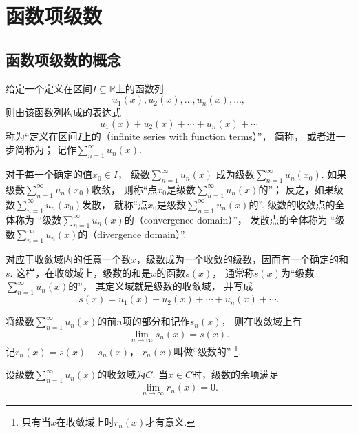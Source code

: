 \section{函数项级数}
\subsection{函数项级数的概念}
\begin{definition}\label{definition:无穷级数.实函数项级数的概念}
给定一个定义在区间\(I \subseteq \mathbb{R}\)上的函数列\[
	u_1(x),u_2(x),\dotsc,u_n(x),\dotsc,
\]
则由该函数列构成的表达式\[
	u_1(x)+u_2(x)+\dotsb+u_n(x)+\dotsb
\]
称为“定义在区间\(I\)上的（infinite series with function terms）”，
简称，
或者进一步简称为；
记作\(\sum\limits_{n=1}^\infty u_n(x)\).

对于每一个确定的值\(x_0 \in I\)，
级数\(\sum\limits_{n=1}^\infty u_n(x)\)
成为级数\(\sum\limits_{n=1}^\infty u_n(x_0)\).
如果级数\(\sum\limits_{n=1}^\infty u_n(x_0)\)收敛，
则称“点\(x_0\)是级数\(\sum\limits_{n=1}^\infty u_n(x)\)的”；
反之，如果级数\(\sum\limits_{n=1}^\infty u_n(x_0)\)发散，
就称“点\(x_0\)是级数\(\sum\limits_{n=1}^\infty u_n(x)\)的”.
级数的收敛点的全体称为
“级数\(\sum\limits_{n=1}^\infty u_n(x)\)的（convergence domain）”，
发散点的全体称为
“级数\(\sum\limits_{n=1}^\infty u_n(x)\)的（divergence domain）”.

对应于收敛域内的任意一个数\(x\)，级数成为一个收敛的级数，因而有一个确定的和\(s\).
这样，在收敛域上，级数的和是\(x\)的函数\(s(x)\)，
通常称\(s(x)\)为“级数\(\sum\limits_{n=1}^\infty u_n(x)\)的”，
其定义域就是级数的收敛域，
并写成\[
	s(x) = u_1(x)+u_2(x)+\dotsb+u_n(x)+\dotsb.
\]

将级数\(\sum\limits_{n=1}^\infty u_n(x)\)的前\(n\)项的部分和记作\(s_n(x)\)，
则在收敛域上有\[
	\lim\limits_{n\to\infty} s_n(x) = s(x).
\]
记\(r_n(x) = s(x)-s_n(x)\)，
\(r_n(x)\)叫做“级数的”%
\footnote{只有当\(x\)在收敛域上时\(r_n(x)\)才有意义.}.
\end{definition}

\begin{property}
设级数\(\sum\limits_{n=1}^\infty u_n(x)\)的收敛域为\(C\).
当\(x \in C\)时，级数的余项满足\[
	\lim\limits_{n\to\infty} r_n(x) = 0.
\]
\end{property}
